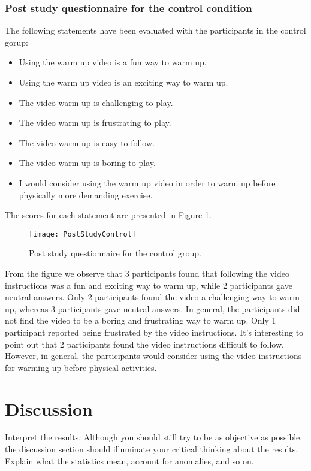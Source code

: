 \subsubsection{Post study questionnaire for the control condition} 
The following statements have been evaluated with the participants in the control gorup:
\begin{itemize}
\item Using the warm up video is a fun way to warm up.
\item Using the warm up video is an exciting way to warm up.
\item The video warm up is challenging to play.
\item The video warm up is frustrating to play.
\item The video warm up is easy to follow.
\item The video warm up is boring to play.
\item I would consider using the warm up video in order to warm up before physically more demanding exercise.
\end{itemize}
The scores for each statement are presented in Figure \ref{fig:poststudycontrol}.\\
\begin{figure}[h]
    \centering
    \texttt{[image: PostStudyControl]}
    \caption{Post study questionnaire for the control group.}
    \label{fig:poststudycontrol}
\end{figure}
From the figure we observe that 3 participants found that following the video instructions was a fun and exciting way to warm up, while 2 participants gave neutral answers. Only 2 participants found the video a challenging way to warm up, whereas 3 participants gave neutral answers. In general, the participants did not find the video to be a boring and frustrating way to warm up. Only 1 participant reported being frustrated by the video instructions. It's interesting to point out that 2 participants found the video instructions difficult to follow. However, in general, the participants would consider using the video instructions for warming up before physical activities.
\section{Discussion}
Interpret the results. Although you should still try to be as objective as possible, the discussion section should illuminate your critical thinking about the results. Explain what the statistics mean, account for anomalies, and so on.

